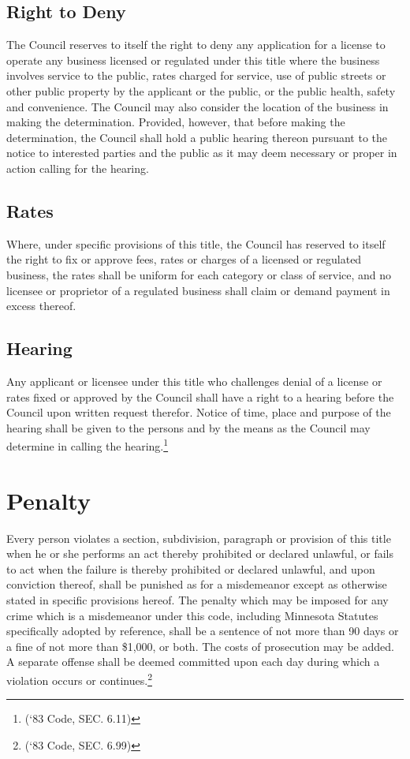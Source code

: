 \subsection{Right to Deny}
The Council reserves to itself the right to deny any application for a license to operate any business licensed or regulated under this title where the business involves service to the public, rates charged for service, use of public streets or other public property by the applicant or the public, or the public health, safety and convenience.  The Council may also consider the location of the business in making the determination.  Provided, however, that before making the determination, the Council shall hold a public hearing thereon pursuant to the notice to interested parties and the public as it may deem necessary or proper in action calling for the hearing.
\subsection{Rates}
Where, under specific provisions of this title, the Council has reserved to itself the right to fix or approve fees, rates or charges of a licensed or regulated business, the rates shall be uniform for each category or class of service, and no licensee or proprietor of a regulated business shall claim or demand payment in excess thereof.
\subsection{Hearing}
Any applicant or licensee under this title who challenges denial of a license or rates fixed or approved by the Council shall have a right to a hearing before the Council upon written request therefor.  Notice of time, place and purpose of the hearing shall be given to the persons and by the means as the Council may determine in calling the hearing.\footnote{(‘83 Code, SEC. 6.11)}

\setcounter{section}{98}
\section{Penalty}
Every person violates a section, subdivision, paragraph or provision of this title when he or she performs an act thereby prohibited or declared unlawful, or fails to act when the failure is thereby prohibited or declared unlawful, and upon conviction thereof, shall be punished as for a misdemeanor except as otherwise stated in specific provisions hereof.  The penalty which may be imposed for any crime which is a misdemeanor under this code, including Minnesota Statutes specifically adopted by reference, shall be a sentence of not more than 90 days or a fine of not more than \$1,000, or both.  The costs of prosecution may be added.  A separate offense shall be deemed committed upon each day during which a violation occurs or continues.\footnote{(‘83 Code, SEC. 6.99)}
